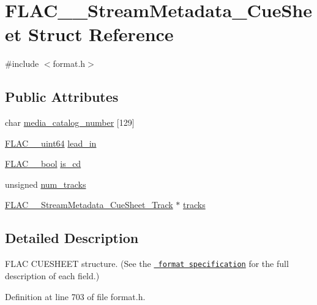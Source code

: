 \hypertarget{struct_f_l_a_c_____stream_metadata___cue_sheet}{}\section{F\+L\+A\+C\+\_\+\+\_\+\+Stream\+Metadata\+\_\+\+Cue\+Sheet Struct Reference}
\label{struct_f_l_a_c_____stream_metadata___cue_sheet}


{\ttfamily \#include $<$format.\+h$>$}

\subsection*{Public Attributes}
\begin{DoxyCompactItemize}
\item 
char \mbox{\hyperlink{struct_f_l_a_c_____stream_metadata___cue_sheet_a776e6057ac7939fba52edecd44ec45bc}{media\+\_\+catalog\+\_\+number}} \mbox{[}129\mbox{]}
\item 
\mbox{\hyperlink{ordinals_8h_aa78c8c70a3eb8a58af7436f278acde8e}{F\+L\+A\+C\+\_\+\+\_\+uint64}} \mbox{\hyperlink{struct_f_l_a_c_____stream_metadata___cue_sheet_a43fdc0a538ef2c3e0926ee22814baf40}{lead\+\_\+in}}
\item 
\mbox{\hyperlink{ordinals_8h_a95103469f1cbd78b8cf250194985b34e}{F\+L\+A\+C\+\_\+\+\_\+bool}} \mbox{\hyperlink{struct_f_l_a_c_____stream_metadata___cue_sheet_a6af66f921aefc6f779fbc0ab6daeab8a}{is\+\_\+cd}}
\item 
unsigned \mbox{\hyperlink{struct_f_l_a_c_____stream_metadata___cue_sheet_a6924f26a8e8fa9023f23539b959fe2ae}{num\+\_\+tracks}}
\item 
\mbox{\hyperlink{struct_f_l_a_c_____stream_metadata___cue_sheet___track}{F\+L\+A\+C\+\_\+\+\_\+\+Stream\+Metadata\+\_\+\+Cue\+Sheet\+\_\+\+Track}} $\ast$ \mbox{\hyperlink{struct_f_l_a_c_____stream_metadata___cue_sheet_a5c0c3440b01b773684d56aeb1e424fab}{tracks}}
\end{DoxyCompactItemize}


\subsection{Detailed Description}
F\+L\+AC C\+U\+E\+S\+H\+E\+ET structure. (See the \href{../format.html\#metadata_block_cuesheet}{\texttt{ format specification}} for the full description of each field.) 

Definition at line 703 of file format.\+h.



